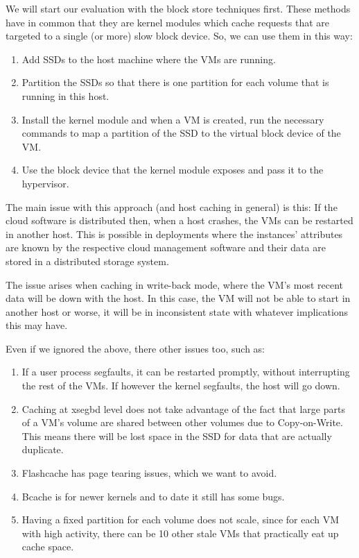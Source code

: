 We will start our evaluation with the block store techniques first. These 
methods have in common that they are kernel modules which cache requests that 
are targeted to a single (or more) slow block device. So, we can use them in 
this way:

\begin{enumerate}
	\item Add SSDs to the host machine where the VMs are running.
	\item Partition the SSDs so that there is one partition for each volume 
		that is running in this host.
	\item Install the kernel module and when a VM is created, run the necessary 
		commands to map a partition of the SSD to the virtual block device of 
		the VM.
	\item Use the block device that the kernel module exposes and pass it to 
		the hypervisor.
\end{enumerate}

The main issue with this approach (and host caching in general) is this: If the 
cloud software is distributed then, when a host crashes, the VMs can be 
restarted in another host. This is possible in deployments where the instances' 
attributes are known by the respective cloud management software and their data 
are stored in a distributed storage system. 

The issue arises when caching in write-back mode, where the VM's most recent 
data will be down with the host. In this case, the VM will not be able to start 
in another host or worse, it will be in inconsistent state with whatever 
implications this may have.

Even if we ignored the above, there other issues too, such as:

\begin{enumerate}
	\item If a user process segfaults, it can be restarted promptly, 
		without interrupting the rest of the VMs. If however the kernel 
		segfaults, the host will go down.
	\item Caching at xsegbd level does not take advantage of the fact that 
		large parts of a VM's volume are shared between other volumes 
		due to Copy-on-Write. This means there will be lost space in 
		the SSD for data that are actually duplicate.
	\item Flashcache has page tearing issues, which we want to avoid.
	\item Bcache is for newer kernels and to date it still has some bugs.
	\item Having a fixed partition for each volume does not scale, since 
		for each VM with high activity, there can be 10 other stale VMs 
		that practically eat up cache space.
\end{enumerate}

